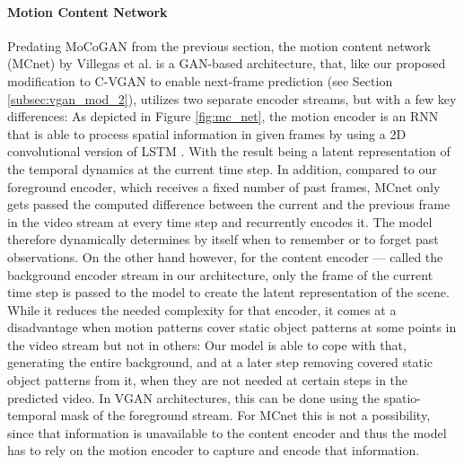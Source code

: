 \paragraph{Motion Content Network}
Predating MoCoGAN from the previous section, the motion content network (MCnet) by Villegas et al. \cite{villegas2017decomposing} is a GAN-based architecture, that, like our proposed modification to C-VGAN to enable next-frame prediction (see Section \ref{subsec:vgan_mod_2}), utilizes two separate encoder streams, but with a few key differences: As depicted in Figure \ref{fig:mc_net}, the motion encoder is an RNN that is able to process spatial information in given frames by using a 2D convolutional version of LSTM \cite{shi2015convolutional}. With the result being a latent representation of the temporal dynamics at the current time step. In addition, compared to our foreground encoder, which receives a fixed number of past frames, MCnet only gets passed the computed difference between the current and the previous frame in the video stream at every time step and recurrently encodes it. The model therefore dynamically determines by itself when to remember or to forget past observations. On the other hand however, for the content encoder --- called the background encoder stream in our architecture, only the frame of the current time step is passed to the model to create the latent representation of the scene. While it reduces the needed complexity for that encoder, it comes at a disadvantage when motion patterns cover static object patterns at some points in the video stream but not in others: Our model is able to cope with that, generating the entire background, and at a later step removing covered static object patterns from it, when they are not needed at certain steps in the predicted video. In VGAN architectures, this can be done using the spatio-temporal mask of the foreground stream. For MCnet this is not a possibility, since that information is unavailable to the content encoder and thus the model has to rely on the motion encoder to capture and encode that information.

